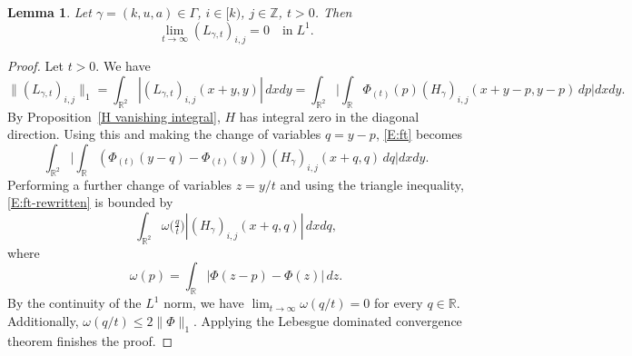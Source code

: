 \documentclass[12pt,reqno]{amsart}
\theoremstyle{plain}
\newtheorem{lemma}[theorem]{Lemma}
\numberwithin{equation}{section}
\theoremstyle{remark}
\newcommand{\using}[1]{}
\newcommand{\Z}{{\mathbb Z}}
\newcommand{\R}{{\mathbb R}}
\begin{document}
\begin{lemma}\label{L:ft-infty}\using{H vanishing integral}
Let $\gamma=(k,u,a)\in \Gamma$, $i\in [k)$, $j\in \Z$, $t>0$. Then
\begin{equation}\label{auto:L-kernel-large-scale-limit}
\lim_{t\to \infty} (L_{\gamma,t})_{i,j} = 0 \quad\text{in}\;L^1.
\end{equation}
\end{lemma}

\begin{proof}
Let $t>0$. We have
\begin{equation}\label{E:ft}
\|(L_{\gamma,t})_{i,j}\|_{1}
=\int_{\R^2} |(L_{\gamma,t})_{i,j}(x+y,y)|\,dx dy
=\int_{\R^2} \Big|\int_{\R} \Phi_{(t)}(p) (H_\gamma)_{i,j}(x+y-p,y-p)\,dp\Big| dx dy.
\end{equation}
By Proposition~\ref{H vanishing integral}, $H$ has integral zero in the diagonal direction. Using this and making the change of variables $q=y-p$, \eqref{E:ft} becomes
\begin{equation}\label{E:ft-rewritten}
\int_{\R^2} \Big|\int_{\R} (\Phi_{(t)}(y-q)-\Phi_{(t)}(y)) (H_\gamma)_{i,j}(x+q,q)\,dq\Big| dx dy.
\end{equation}
Performing a further change of variables $z=y/t$ and using the triangle inequality, \eqref{E:ft-rewritten} is bounded by
\[
\int_{\R^2} \omega\Big(\tfrac{q}{t}\Big) |(H_\gamma)_{i,j}(x+q,q)|\,dx dq,
\]
where
\[
\omega(p)=\int_{\R}|\Phi(z-p)-\Phi(z)|\,dz.
\]
By the continuity of the $L^1$ norm, we have $\lim_{t\to \infty} \omega(q/t)=0$ for every $q\in \R$. Additionally, $\omega(q/t) \leq 2\|\Phi\|_1$. Applying the Lebesgue dominated convergence theorem finishes the proof.
\end{proof}
\end{document}
